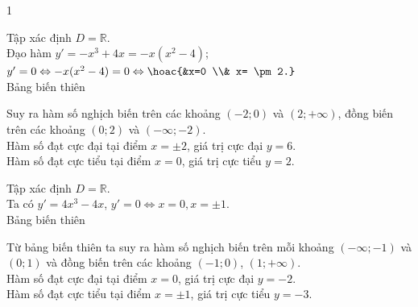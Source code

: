 \begin{bt}
{\begin{enumEX}{1}
			 \item Tập xác định $D=\mathbb{R}$.\\
			Đạo hàm $y'=-x^3+4x=-x(x^2-4)$; $y'=0 \Leftrightarrow-x(x^2-4)=0 \Leftrightarrow\hoac{&x=0 \\& x= \pm  2.}$\\
			Bảng  biến thiên
			\begin{center}
			\end{center}
			 Suy ra hàm số nghịch biến trên các khoảng $(-2;0)$ và $(2;+\infty)$, đồng biến trên các khoảng $(0;2)$ và $(-\infty;-2)$.\\
			Hàm số đạt cực đại tại điểm $x=  \pm 2$, giá trị cực đại $y=6$.\\
			Hàm số đạt cực tiểu tại  điểm $x=0$, giá trị cực tiểu $y=2$.
			\item Tập  xác định $D=\mathbb{R}$.\\
			Ta có $y'=4x^3-4x$, $y'=0 \Leftrightarrow  x=0, x= \pm 1$.\\
			Bảng  biến thiên
			\begin{center}
			\end{center}
			Từ bảng  biến thiên ta suy ra hàm số nghịch biến trên mỗi khoảng $(-\infty;-1)$ và $(0; 1)$ và đồng biến trên các khoảng $(-1;0)$, $(1;+\infty)$.\\
			Hàm số đạt cực đại tại điểm $x=0$, giá trị  cực đại $y=-2$.\\
			Hàm số đạt cực tiểu  tại điểm $x= \pm 1$, giá trị cực tiểu $y=-3$.
		\end{enumEX}
	} 
\end{bt}


